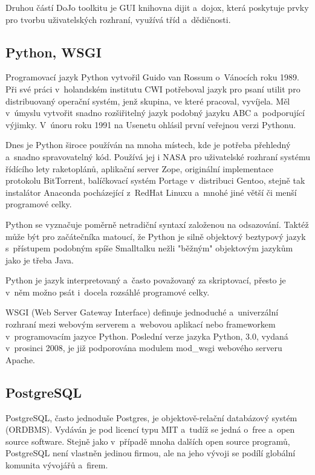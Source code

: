 \documentclass[bc,male,html,dept460]{diploma}				%
\begin{document}
Druhou částí DoJo toolkitu je GUI knihovna dijit a~dojox, která poskytuje prvky pro tvorbu uživatel\-ských rozhraní, využívá tříd a~dědičnosti.

\subsection{Python, WSGI}
Programovací jazyk Python vytvořil Guido van Rossum o~Vánocích roku 1989.
Při své práci v~holandském institutu CWI potřeboval jazyk pro psaní utilit pro distribuovaný operační systém,
jenž skupina, ve které pracoval, vyvíjela.
Měl v~úmyslu vytvořit snadno rozšiřitelný jazyk podobný jazyku ABC a~podporující výjimky.
V~únoru roku 1991 na Usenetu ohlásil první veřejnou verzi Pythonu. 

Dnes je Python široce používán na mnoha místech, kde je potřeba přehledný a~snadno spravovatelný kód.
Používá jej i NASA pro uživatelské rozhraní systému řídícího lety raketoplánů, aplikační server Zope,
originální implementace protokolu BitTorrent, balíčkovací systém Portage v~distribuci Gentoo,
stejně tak instalátor Anaconda pocházející z~RedHat Linuxu a~mnohé jiné větší či menší programové celky. 

Python se vyznačuje poměrně netradiční syntaxí založenou na odsazování.
Taktéž může být pro začátečníka matoucí,
že Python je silně objektový beztypový jazyk s~přístupem podobným spíše Smalltalku nežli "běžným"
objektovým jazykům jako je třeba Java. 

Python je jazyk interpretovaný a~často považovaný za skriptovací, přesto je v~něm možno psát i~docela rozsáhlé programové celky.
 
WSGI (Web Server Gateway Interface) definuje jednoduché a~univerzální rozhraní mezi webovým serverem
a~webovou aplikací nebo frameworkem v~programovacím jazyce Python.
Poslední verze jazyka Python, 3.0, vydaná v~prosinci 2008, je již podporována modulem mod\_wsgi webového serveru Apache.
\cite{svec-letajici-cirkus}

\subsection{PostgreSQL}
PostgreSQL, často jednoduše Postgres, je objektově-relační databázový systém (ORDBMS).
Vydáván je pod licencí typu MIT a~tudíž se jedná o~free a~open source software.
Stejně jako v~případě mnoha dalších open source programů, PostgreSQL není vlastněn jedinou firmou,
ale na jeho vývoji se podílí globální komunita vývojářů a~firem.
\end{document}
